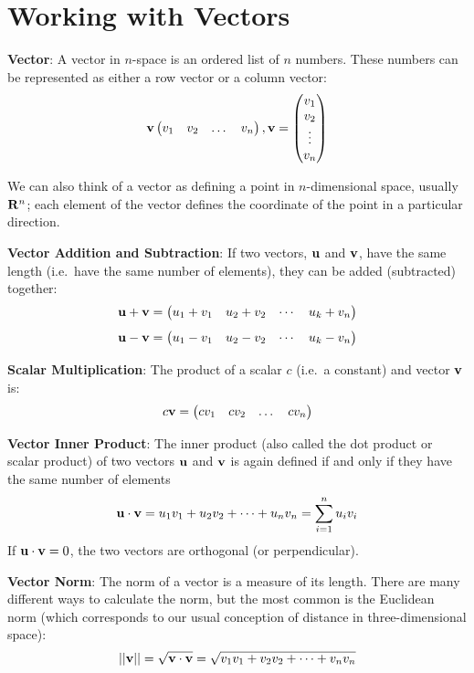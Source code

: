 \documentclass[]{book}
\theoremstyle{definition}
\theoremstyle{definition}
\theoremstyle{definition}
\theoremstyle{remark}
\begin{document}
\hypertarget{vector-def}{%
\section{Working with Vectors}\label{vector-def}}

\textbf{Vector}: A vector in \(n\)-space is an ordered list of \(n\) numbers. These numbers can be represented as either a row vector or a column vector:
\[ {\bf v} \begin{pmatrix} v_1 & v_2 & \dots & v_n\end{pmatrix} , {\bf v} = \begin{pmatrix} v_1 \\ v_2 \\ \vdots \\ v_n \end{pmatrix}\]

We can also think of a vector as defining a point in \(n\)-dimensional space, usually \({\bf R}^n\); each element of the vector defines the coordinate of the point in a particular direction.

\textbf{Vector Addition and Subtraction}: If two vectors, \({\bf u}\) and \({\bf v}\), have the same length (i.e.~have the same number of elements), they can be added (subtracted) together:
\[ {\bf u} + {\bf v} = \begin{pmatrix} u_1 + v_1 & u_2 + v_2 & \cdots & u_k + v_n \end{pmatrix}\]
\[ {\bf u} - {\bf v} = \begin{pmatrix} u_1 - v_1 & u_2 - v_2 & \cdots & u_k - v_n \end{pmatrix}\]

\textbf{Scalar Multiplication}: The product of a scalar \(c\) (i.e.~a constant) and vector \({\bf v}\) is:\\
\[ c{\bf v} =  \begin{pmatrix} cv_1 & cv_2 & \dots & cv_n \end{pmatrix} \]

\textbf{Vector Inner Product}: The inner product (also called the dot product or scalar product) of two vectors \({\bf u}\) and \({\bf v}\) is again defined if and only if they have the same number of elements
\[ {\bf u} \cdot {\bf v} = u_1v_1 + u_2v_2 + \cdots + u_nv_n = \sum_{i = 1}^n u_iv_i\]
If \({\bf u} \cdot {\bf v} = 0\), the two vectors are orthogonal (or perpendicular).

\textbf{Vector Norm}: The norm of a vector is a measure of its length. There are many different ways to calculate the norm, but the most common is the Euclidean norm (which corresponds to our usual conception of distance in three-dimensional space):
\[ ||{\bf v}|| = \sqrt{{\bf v}\cdot{\bf v}} = \sqrt{ v_1v_1 + v_2v_2 + \cdots + v_nv_n}\]
\end{document}
